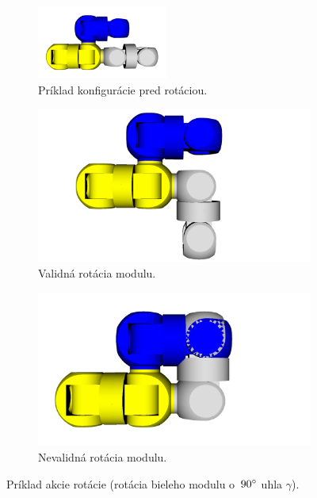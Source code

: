 \documentclass[
  printed, %
  oneside, %
  notable,   %
  nolof,     %
  nolot,     %
]{fithesis3}
\begin{document}
\begin{figure}[hbt!]
    \centering
    \begin{subfigure}[b]{\textwidth}
        \centering
        \includegraphics[width=0.47\textwidth]{pictures/rotation_example.png}
        \caption[Pred rotáciou]{Príklad konfigurácie pred rotáciou.}
    \end{subfigure}

    \begin{subfigure}[b]{0.47\textwidth}
        \includegraphics[width=\textwidth]{pictures/rotation_example_correct.png}
        \caption[Validná rotácia]{Validná rotácia modulu.}
    \end{subfigure}
    \begin{subfigure}[b]{0.47\textwidth}
        \includegraphics[width=\textwidth]{pictures/rotation_example_wrong.png}
        \caption[Nevalidná rotácia]{Nevalidná rotácia modulu.}
    \end{subfigure}
    \caption[Príklad akcie rotácie]{Príklad akcie rotácie (rotácia bieleho modulu o~$90\degree$ uhla $\gamma$).}
    \label{fig:rotationExample}
\end{figure}
\end{document}
